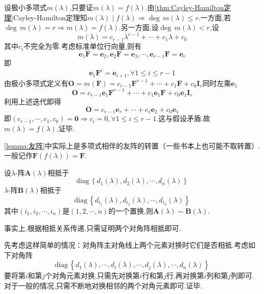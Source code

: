 \begin{green}
\begin{Proof}
设极小多项式$m\left(\lambda\right)$,只要证$m\left(\lambda\right)=f\left(\lambda\right)$.由\cref{thm:Cayley-Hamilton定理}\textup{Cayley-Hamilton}定理知$m\left(\lambda\right)\mid f\left(\lambda\right)\Longrightarrow
\deg\,m\left(\lambda\right)\leqslant r.$一方面,若$\deg\,m\left(\lambda\right)=r\Longrightarrow m\left(\lambda\right)=f\left(\lambda\right).$另一方面,设$\deg\,m\left(\lambda\right)<r$,设\[
m\left(\lambda\right)=c_{r-1}\lambda^{r-1}+\cdots+c_1\lambda+c_0
\]其中$c_i$不完全为零.考虑标准单位行向量,则有
\[
\bm{e}_1\bm{F}=\bm{e}_2,\bm{e}_2\bm{F}=\bm{e}_3,\cdots,\bm{e}_{r-1}\bm{F}=\bm{e}_r
\]即\[
\bm{e}_1\bm{F}^i=\bm{e}_{i+1},\forall 1\leqslant i\leqslant r-1
\]由极小多项式定义有$\bm{O}=m\left(\bm{F}\right)=
c_{r-1}\bm{F}^{r-1}+\cdots+c_1\bm{F}+c_0\bm{I}_r
$同时左乘$\bm{e}_1$
\[
\bm{O}=c_{r-1}\bm{e}_1\bm{F}^{r-1}+\cdots+c_1\bm{e}_1\bm{F}+c_0\bm{e}_1\bm{I}_r
\]利用上述迭代即得
\[
\bm{O}=c_{r-1}\bm{e}_r+\cdots+c_1\bm{e}_2+c_0\bm{e}_1
\]即$\left(
c_{r-1},\cdots,c_1,c_0
\right)=\bm{0}\Longrightarrow
c_i=0,\forall 1\leqslant i\leqslant r-1
$.这与假设矛盾.故$m\left(\lambda\right)=f\left(\lambda\right)$,证毕.
\end{Proof}
\end{green}
\begin{red}
    \begin{remark}
        \cref{lemma:友阵}中实际上是多项式相伴的友阵的转置（一些书本上也可能不取转置）.一般记作$\bm{F}\left(f\left(\lambda\right)\right)=\bm{F}.$
    \end{remark}
\end{red}
\begin{green}
\begin{lemma}[相抵的另一刻画]\label{lemma:相抵的另一刻画}
    设$\lambda$-阵$\bm{A}\left(\lambda\right)$相抵于\[
    \mathrm{diag}\,\left\{
        d_1\left(\lambda\right),d_2\left(\lambda\right),\cdots,d_n\left(\lambda\right)
    \right\}
    \]$\lambda$-阵$\bm{B}\left(\lambda\right)$相抵于\[
    \mathrm{diag}\,\left\{
        d_{i_1}\left(\lambda\right),d_{i_2}\left(\lambda\right),\cdots,d_{i_n}\left(\lambda\right)
    \right\}
    \]其中$\left(
    i_1,i_2,\cdots,i_n
    \right)$是$\left(1,2,\cdots,n\right)$的一个置换,则$\bm{A}\left(\lambda\right)\sim\bm{B}\left(\lambda\right)$.
\end{lemma}
\begin{Proof}
事实上,根据相抵关系传递,只需证明两个对角阵相抵即可.

先考虑这样简单的情况：对角阵主对角线上两个元素对换时它们是否相抵.考虑如下对角阵
\[
\mathrm{diag}\,\left\{
    d_1\left(\lambda\right),\cdots,d_i\left(\lambda\right),\cdots,d_j\left(\lambda\right),\cdots,d_n\left(\lambda\right)
\right\}
\]
要将第$i$和第$j$个对角元素对换,只需先对换第$i$行和第$j$行,再对换第$i$列和第$j$列即可.对于一般的情况,只需不断地对换相邻的两个对角元素即可.证毕.
\end{Proof}
\end{green}
